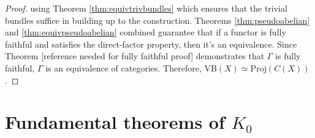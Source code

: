 \documentclass[12pt]{report}
\numberwithin{equation}{section}
\newcommand{\Z}{\mathbb{Z}}
\newcommand{\N}{\mathbb{N}}
\newtheorem{definition}[dummy]{Definition}
\newtheorem{proposition}[dummy]{Proposition}
\begin{document}
\begin{proof}
		using Theorem \ref{thm:equivtrivbundles} which ensures that the trivial bundles suffice in building up to the construction.  Theorems \ref{thm:pseudoabelian} and \ref{thm:equivpseudoabelian} combined guarantee that if a functor is fully faithful and satisfies the direct-factor property, then it’s an equivalence.  Since Theorem [reference needed for fully faithful proof] demonstrates that $\Gamma$ is fully faithful, $\Gamma$ is an equivalence of categories.  Therefore,  $\mathrm{VB}(X) \simeq \mathrm{Proj}(C(X))$.
	\end{proof}

	
	\chapter{Fundamental theorems of $K_0$ }
%	
%	
%	
%	
%	
%		
\end{document}
